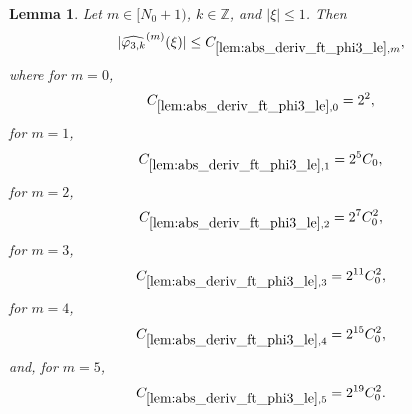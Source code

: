 \documentclass[12pt,reqno]{amsart}
\theoremstyle{plain}
\newtheorem{lemma}[theorem]{Lemma}
\numberwithin{equation}{section}
\theoremstyle{remark}
\newcommand{\using}[1]{}
\newcommand{\Z}{{\mathbb Z}}
\newcommand{\jr}[1]{{\color{orange}{[J: #1]}}}
\newcommand{\cgpt}{\tikz\fill[teal!70!black,scale=0.4](0,.35) -- (.25,0) -- (1,.7) -- (.25,.15) -- cycle;}
\begin{document}
\begin{lemma}\label{lem:abs_deriv_ft_phi3_le}\using{lem:ft_phi3_eq}
Let $m\in[N_0+1)$, $k\in\Z$, and $|\xi|\le1$. Then
\begin{equation}\label{auto:varphi-three-Fourier-derivative-bound}
|\widehat{\varphi_{3,k}}^{(m)}(\xi)|
\le C_{\ref{lem:abs_deriv_ft_phi3_le},m},
\end{equation}
where \jr{GPT: Please refactor the following display. We do not want any multiline formulas/begin cases. Just state all the cases separately, same in the similar displays below. Also, maybe we don't need 5 derivatives after the constant improvement above, check. \cgpt}
for $m=0$,
\begin{equation}\label{auto:varphi-three-Fourier-derivative-constant}
C_{\ref{lem:abs_deriv_ft_phi3_le},0}=2^2,
\end{equation}
for $m=1$,
\begin{equation}\label{auto:varphi-three-Fourier-derivative-constant-one}
C_{\ref{lem:abs_deriv_ft_phi3_le},1}=2^5C_0,
\end{equation}
for $m=2$,
\begin{equation}\label{auto:varphi-three-Fourier-derivative-constant-two}
C_{\ref{lem:abs_deriv_ft_phi3_le},2}=2^7C_0^2,
\end{equation}
for $m=3$,
\begin{equation}\label{auto:varphi-three-Fourier-derivative-constant-three}
C_{\ref{lem:abs_deriv_ft_phi3_le},3}=2^{11}C_0^2,
\end{equation}
for $m=4$,
\begin{equation}\label{auto:varphi-three-Fourier-derivative-constant-four}
C_{\ref{lem:abs_deriv_ft_phi3_le},4}=2^{15}C_0^2,
\end{equation}
and, for $m=5$,
\begin{equation}\label{auto:varphi-three-Fourier-derivative-constant-five}
C_{\ref{lem:abs_deriv_ft_phi3_le},5}=2^{19}C_0^2.
\end{equation}
\end{lemma}
\end{document}
